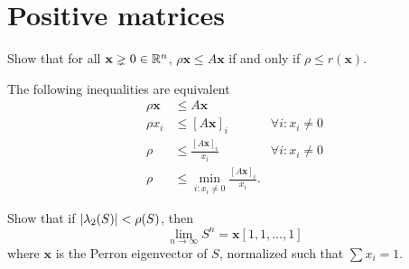 \section{Positive matrices}

Show that for all \(\mathbf{x} \gneq 0 \in \mathbb{R}^n\), \(\rho \mathbf{x} \leq A\mathbf{x}\) if and only if \(\rho \leq r(\mathbf{x})\).

\begin{solution}
	The following inequalities are equivalent
	\begin{align*}
	\rho \mathbf{x} & \leq A\mathbf{x}\\
	\rho x_i & \leq [A\mathbf{x}]_i & \forall i: x_i \neq 0\\
	\rho & \leq \frac{[A\mathbf{x}]_i}{x_i} & \forall i: x_i \neq 0\\
	\rho & \leq \min_{i: x_i \neq 0} \frac{[A\mathbf{x}]_i}{x_i}.
	\end{align*}
\end{solution}

Show that if \({\left\lvert\lambda_2(S)\right\lvert} < \rho(S)\), then
\[
\lim_{n \to \infty} S^n = \mathbf{x}[1, 1, \dots, 1]
\]
where \(\mathbf{x}\) is the Perron eigenvector of \(S\), normalized such that \(\sum x_i = 1\).

